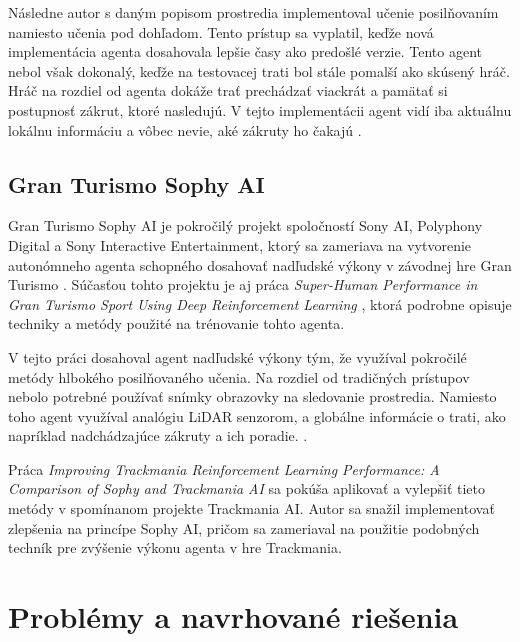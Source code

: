 Následne autor s daným popisom prostredia implementoval učenie posilňovaním namiesto učenia pod dohľadom. Tento prístup sa vyplatil, keďže nová implementácia agenta dosahovala lepšie časy ako predošlé verzie. Tento agent nebol však dokonalý, keďže na testovacej trati bol stále pomalší ako skúsený hráč. Hráč na rozdiel od agenta dokáže trať prechádzať viackrát a pamätať si postupnosť zákrut, ktoré nasledujú. V tejto implementácii agent vidí iba aktuálnu lokálnu informáciu a vôbec nevie, aké zákruty ho čakajú \cite{trackmania_ai_github}.



\subsection{Gran Turismo Sophy AI}

Gran Turismo Sophy AI je pokročilý projekt spoločností Sony AI, Polyphony Digital a Sony Interactive Entertainment, ktorý sa zameriava na vytvorenie autonómneho agenta schopného dosahovať nadľudské výkony v závodnej hre Gran Turismo \cite{sophy_ai}. Súčasťou tohto projektu je aj práca \textit{Super-Human Performance in Gran Turismo Sport Using Deep Reinforcement Learning} \cite{super_human_grand_turismo}, ktorá podrobne opisuje techniky a metódy použité na trénovanie tohto agenta.

V tejto práci dosahoval agent nadľudské výkony tým, že využíval pokročilé metódy hlbokého posilňovaného učenia. Na rozdiel od tradičných prístupov nebolo potrebné používať snímky obrazovky na sledovanie prostredia. Namiesto toho agent využíval analógiu LiDAR senzorom, a globálne informácie o trati, ako napríklad nadchádzajúce zákruty a ich poradie. \cite{super_human_grand_turismo}.

Práca \textit{Improving Trackmania Reinforcement Learning Performance: A Comparison of Sophy and Trackmania AI} \cite{imporving_trackmania_AI} sa pokúša aplikovať a vylepšiť tieto metódy v spomínanom projekte Trackmania AI. Autor sa snažil implementovať zlepšenia na princípe Sophy AI, pričom sa zameriaval na použitie podobných techník pre zvýšenie výkonu agenta v hre Trackmania.



\section{Problémy a navrhované riešenia}
\label{sec
}

